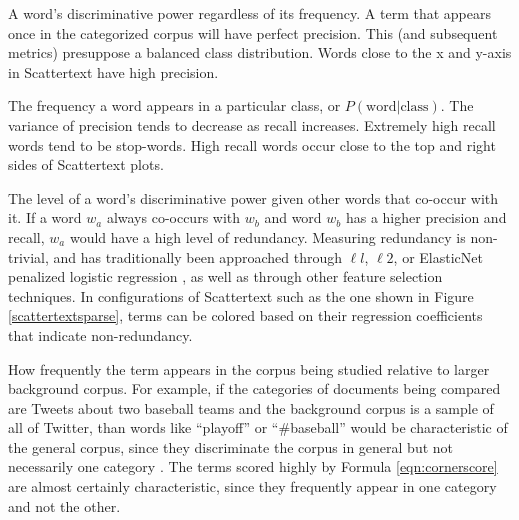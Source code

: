 \documentclass[11pt,a4paper]{article}
\begin{document}
\begin{description}[style=unboxed,leftmargin=0cm]
\item[Precision] A word's discriminative power regardless of its frequency.  A term that appears once in the categorized corpus will have perfect precision. This (and subsequent metrics) presuppose a balanced class distribution.  Words close to the x and y-axis in Scattertext have high precision.  \vspace{-0.1in}
\item[Recall] The frequency a word appears in a particular class, or $P(\mbox{word}|\mbox{class})$.  The variance of precision tends to decrease as recall increases.  Extremely high recall words tend to be stop-words.  High recall words occur close to the top and right sides of Scattertext plots.  \vspace{-0.1in}
\item[Non-redundancy] The level of a word's discriminative power given other words that co-occur with it.  If a word $w_a$ always co-occurs with $w_b$ and word $w_b$ has a higher precision and recall, $w_a$ would have a high level of redundancy. Measuring redundancy is non-trivial, and has traditionally been approached through ${\ell}l$, ${\ell}2$, or ElasticNet penalized logistic regression \cite{joshi2010}, as well as through other feature selection techniques.  In configurations of Scattertext such as the one shown in Figure \ref{scattertextsparse}, terms can be colored based on their regression coefficients that indicate non-redundancy.  \vspace{-0.1in}
\item[Characteristicness] How frequently the term appears in the corpus being studied relative to larger background corpus.  For example, if the categories of documents being compared are Tweets about two baseball teams and the background corpus is a sample of all of Twitter, than words like ``playoff'' or ``\#baseball'' would be characteristic of the general corpus, since they discriminate the corpus in general but not necessarily one category \cite{vennclouds}.  The terms scored highly by Formula \ref{eqn:cornerscore} are almost certainly characteristic, since they frequently appear in one category and not the other.  \vspace{-0.1in}
\end{description}
\end{document}
